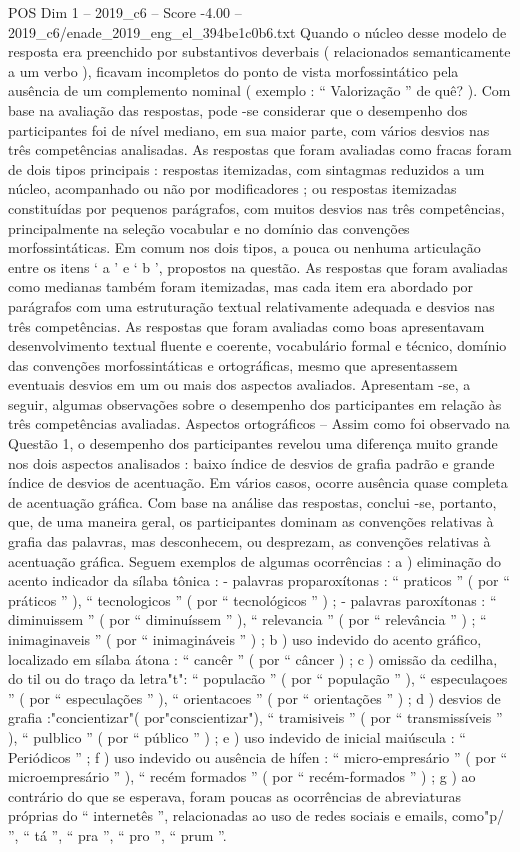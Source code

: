 \begin{textsample}{POS Dim 1 – 2019\_c6 – Score -4.00 – 2019\_c6/enade\_2019\_eng\_el\_394be1c0b6.txt}
Quando o núcleo desse modelo de resposta era preenchido por substantivos deverbais ( relacionados semanticamente a um verbo ), ficavam incompletos do ponto de vista morfossintático pela ausência de um complemento nominal ( exemplo : “ Valorização ” de quê? ).
Com base na avaliação das respostas, pode -se considerar que o desempenho dos participantes foi de nível mediano, em sua maior parte, com vários desvios nas três competências analisadas.
As respostas que foram avaliadas como fracas foram de dois tipos principais : respostas itemizadas, com sintagmas reduzidos a um núcleo, acompanhado ou não por modificadores ; ou respostas itemizadas constituídas por pequenos parágrafos, com muitos desvios nas três competências, principalmente na seleção vocabular e no domínio das convenções morfossintáticas.
Em comum nos dois tipos, a pouca ou nenhuma articulação entre os itens ‘ a ’ e ‘ b ’, propostos na questão.
As respostas que foram avaliadas como medianas também foram itemizadas, mas cada item era abordado por parágrafos com uma estruturação textual relativamente adequada e desvios nas três competências.
As respostas que foram avaliadas como boas apresentavam desenvolvimento textual fluente e coerente, vocabulário formal e técnico, domínio das convenções morfossintáticas e ortográficas, mesmo que apresentassem eventuais desvios em um ou mais dos aspectos avaliados.
Apresentam -se, a seguir, algumas observações sobre o desempenho dos participantes em relação às três competências avaliadas.
Aspectos ortográficos – Assim como foi observado na Questão 1, o desempenho dos participantes revelou uma diferença muito grande nos dois aspectos analisados : baixo índice de desvios de grafia padrão e grande índice de desvios de acentuação.
Em vários casos, ocorre ausência quase completa de acentuação gráfica.
Com base na análise das respostas, conclui -se, portanto, que, de uma maneira geral, os participantes dominam as convenções relativas à grafia das palavras, mas desconhecem, ou desprezam, as convenções relativas à acentuação gráfica.
Seguem exemplos de algumas ocorrências : a ) eliminação do acento indicador da sílaba tônica : - palavras proparoxítonas : “ praticos ” ( por “ práticos ” ), “ tecnologicos ” ( por “ tecnológicos ” ) ; - palavras paroxítonas : “ diminuissem ” ( por “ diminuíssem ” ), “ relevancia ” ( por “ relevância ” ) ; “ inimaginaveis ” ( por “ inimagináveis ” ) ; b ) uso indevido do acento gráfico, localizado em sílaba átona : “ cancêr ” ( por “ câncer ) ; c ) omissão da cedilha, do til ou do traço da letra"t": “ populacão ” ( por “ população ” ), “ especulaçoes ” ( por “ especulações ” ), “ orientacoes ” ( por “ orientações ” ) ; d ) desvios de grafia :"concientizar"( por"conscientizar"), “ tramisiveis ” ( por “ transmissíveis ” ), “ pulblico ” ( por “ público ” ) ; e ) uso indevido de inicial maiúscula : “ Periódicos ” ; f ) uso indevido ou ausência de hífen : “ micro-empresário ” ( por “ microempresário ” ), “ recém formados ” ( por “ recém-formados ” ) ; g ) ao contrário do que se esperava, foram poucas as ocorrências de abreviaturas próprias do “ internetês ”, relacionadas ao uso de redes sociais e emails, como"p/ ”, “ tá ”, “ pra ”, “ pro ”, “ prum ”.

\end{textsample}
